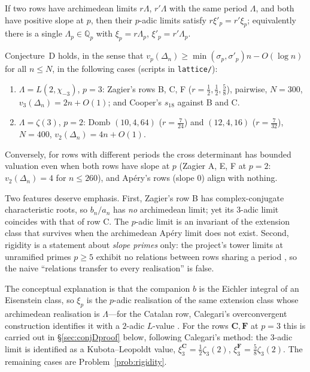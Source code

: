 \begin{namedconj}[D: rigidity]\label{conj:D}
If two rows have archimedean limits $r\Lambda$, $r'\Lambda$ with the same period $\Lambda$, and both have positive slope at $p$, then their $p$-adic limits satisfy $r\xi'_p=r'\xi_p$; equivalently there is a single $\Lambda_p\in\mathbb Q_p$ with $\xi_p=r\Lambda_p$, $\xi'_p=r'\Lambda_p$.
\end{namedconj}

\begin{verification}\label{ver:rigidity}
Conjecture~D holds, in the sense that $v_p(\Delta_n)\ge\min(\sigma_p,\sigma'_p)n-O(\log n)$ for all $n\le N$, in the following cases (scripts in \texttt{lattice/}):
\begin{enumerate}
\item $\Lambda=L(2,\chi_{-3})$, $p=3$: Zagier's rows B, C, F ($r=\tfrac12,\tfrac12,\tfrac58$), pairwise, $N=300$, $v_3(\Delta_n)=2n+O(1)$; and Cooper's $s_{18}$ against B and C.
\item $\Lambda=\zeta(3)$, $p=2$: Domb $(10,4,64)$ ($r=\tfrac7{24}$) and $(12,4,16)$ ($r=\tfrac7{32}$), $N=400$, $v_2(\Delta_n)=4n+O(1)$.
\end{enumerate}
Conversely, for rows with different periods the cross determinant has bounded valuation even when both rows have slope at $p$ (Zagier A, E, F at $p=2$: $v_2(\Delta_n)=4$ for $n\le260$), and Ap\'ery's rows (slope $0$) align with nothing.
\end{verification}

Two features deserve emphasis. First, Zagier's row B has complex-conjugate characteristic roots, so $b_n/a_n$ has \emph{no} archimedean limit; yet its $3$-adic limit coincides with that of row C. The $p$-adic limit is an invariant of the extension class that survives when the archimedean Ap\'ery limit does not exist. Second, rigidity is a statement about \emph{slope primes} only: the project's tower limits at unramified primes $p\ge5$ exhibit no relations between rows sharing a period \cite{ProjTheory03}, so the naive ``relations transfer to every realisation'' is false.

The conceptual explanation is that the companion $b$ is the Eichler integral of an Eisenstein class, so $\xi_p$ is the $p$-adic realisation of the same extension class whose archimedean realisation is $\Lambda$---for the Catalan row, Calegari's overconvergent construction identifies it with a $2$-adic $L$-value \cite{Cal05}. For the rows $\mathbf C,\mathbf F$ at $p=3$ this is carried out in \S\ref{sec:conjDproof} below, following Calegari's method: the $3$-adic limit is identified as a Kubota--Leopoldt value, $\xi^{\mathbf C}_3=\tfrac12\zeta_3(2)$, $\xi^{\mathbf F}_3=\tfrac58\zeta_3(2)$. The remaining cases are Problem~\ref{prob:rigidity}.

